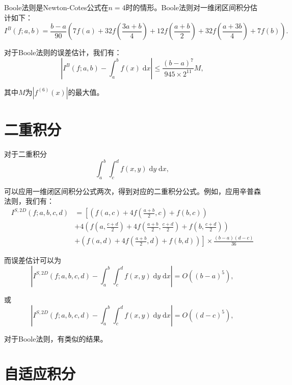\documentclass[lang=cn,10pt,bibend=bibtex]{elegantbook}
\begin{document}
Boole法则是Newton-Cotes公式在$n=4$时的情形。Boole法则对一维闭区间积分估计如下：
\begin{equation*}
  I^B(f;a,b) = \frac{b-a}{90}\left(7f(a)+32f\left(\frac{3a+b}{4}\right)+12f\left(\frac{a+b}{2}\right)+32f\left(\frac{a+3b}{4}\right)+7f(b)\right).
\end{equation*}

对于Boole法则的误差估计，我们有：
\begin{equation*}
  \left|I^B(f;a,b)-\int_a^b f(x) \;\text{d}x\right|\leq \frac{(b-a)^7}{945\times 2^{11}}M,
\end{equation*}

其中$M$为$|f^{(6)}(x)|$的最大值。

\section{二重积分}

对于二重积分
\begin{equation*}
  \int_a^b\int_c^d f(x,y) \;\text{d}y\;\text{d}x,
\end{equation*}

可以应用一维闭区间积分公式两次，得到对应的二重积分公式。例如，应用辛普森法则，我们有：
\begin{align*}
  I^{S,2D}(f;a,b,c,d)&= \left[\left(f(a,c)+4f\left(\frac{a+b}{2},c\right)+f(b,c)\right)\right.\\
  &+ 4\left(f\left(a,\frac{c+d}{2}\right)+4f\left(\frac{a+b}{2},\frac{c+d}{2}\right)+f\left(b,\frac{c+d}{2}\right)\right)\\
  &+ \left.\left(f(a,d)+4f\left(\frac{a+b}{2},d\right)+f(b,d)\right)\right] \times \frac{(b-a)(d-c)}{36}
\end{align*}

而误差估计可以为
\begin{equation*}
  \left|I^{S,2D}(f;a,b,c,d)-\int_a^b\int_c^d f(x,y) \;\text{d}y\;\text{d}x\right| = O((b-a)^5),
\end{equation*}

或
\begin{equation*}
  \left|I^{S,2D}(f;a,b,c,d)-\int_a^b\int_c^d f(x,y) \;\text{d}y\;\text{d}x\right| = O((d-c)^5),
\end{equation*}

对于Boole法则，有类似的结果。

\section{自适应积分}
\end{document}
